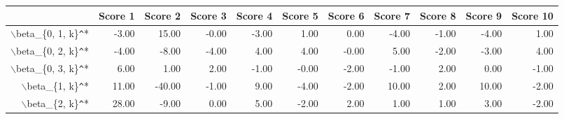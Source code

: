 \begin{table}[ht]
\centering
\begin{tabular}{rrrrrrrrrrr}
  \hline
 & Score 1 & Score 2 & Score 3 & Score 4 & Score 5 & Score 6 & Score 7 & Score 8 & Score 9 & Score 10 \\ 
  \hline
$\backslash$beta\_\{0, 1, k\}\verb|^|* & -3.00 & 15.00 & -0.00 & -3.00 & 1.00 & 0.00 & -4.00 & -1.00 & -4.00 & 1.00 \\ 
  $\backslash$beta\_\{0, 2, k\}\verb|^|* & -4.00 & -8.00 & -4.00 & 4.00 & 4.00 & -0.00 & 5.00 & -2.00 & -3.00 & 4.00 \\ 
  $\backslash$beta\_\{0, 3, k\}\verb|^|* & 6.00 & 1.00 & 2.00 & -1.00 & -0.00 & -2.00 & -1.00 & 2.00 & 0.00 & -1.00 \\ 
  $\backslash$beta\_\{1, k\}\verb|^|* & 11.00 & -40.00 & -1.00 & 9.00 & -4.00 & -2.00 & 10.00 & 2.00 & 10.00 & -2.00 \\ 
  $\backslash$beta\_\{2, k\}\verb|^|* & 28.00 & -9.00 & 0.00 & 5.00 & -2.00 & 2.00 & 1.00 & 1.00 & 3.00 & -2.00 \\ 
   \hline
\end{tabular}
\end{table}
